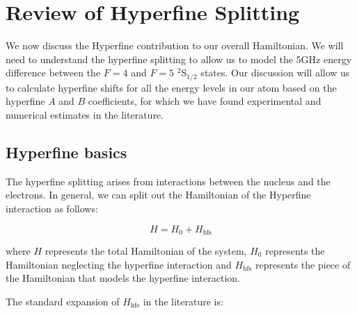 
\section{Review of Hyperfine Splitting}

We now discuss the Hyperfine contribution to our overall Hamiltonian. We will need to understand the hyperfine splitting to allow us to model the 5GHz energy difference between the $F=4$ and $F=5$ $^2$S$_{1/2}$ states. Our discussion will allow us to calculate hyperfine shifts for all the energy levels in our atom based on the hyperfine $A$ and $B$ coefficients, for which we have found experimental and numerical estimates in the literature.

\subsection{Hyperfine basics}

The hyperfine splitting arises from interactions between the nucleus and the electrons. In general, we can split out the Hamiltonian of the Hyperfine interaction as follows: 

\begin{equation}
H=H_0+H_{\mathrm{hfs}}
\end{equation}

where $H$ represents the total Hamiltonian of the system, $H_0$ represents the Hamiltonian neglecting the hyperfine interaction and $H_{\mathrm{hfs}}$ represents the piece of the Hamiltonian that models the hyperfine interaction. 

The standard expansion of $H_{\mathrm{hfs}}$ in the literature is:  

